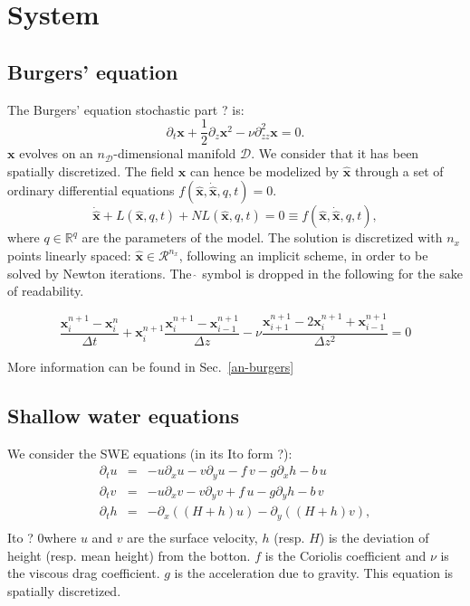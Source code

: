 \documentclass[aip,pof,nofootinbib,reprint,onecolumn]{revtex4-1}
\newcommand{\todo}[1]{{\color{red} #1 }}
\newcommand{\gras}[1]{\boldsymbol{#1}}
\newcommand{\mypar}[1]{\left(#1\right)}
\newcommand{\Ephaz}{\mathcal{D}}%
\newcommand{\Nphaz}{n_{\mathcal{D}}} %
\newcommand{\fdyn}{f} %
\newcommand{\point}{\gras{x}} %
\begin{document}
\section{System}
\label{sec-sys}

\subsection{Burgers' equation}
\label{ssec-burgers}
The Burgers' equation \todo{stochastic part ?}is:
$$ \partial_t \point + \frac{1}{2} \partial_z \point^2 - \nu \partial^2_{zz}\point = 0. $$
$\point$ evolves on an $\Nphaz$-dimensional manifold $\Ephaz$. 
We consider that it has been spatially discretized. The field $\point$ can hence be modelized by $\hat{\point}$ through a set of ordinary differential equations $ \fdyn(\hat{\point},\dot{\hat{\point}},q,t) =0.$
$$ \dot{\hat{\point}} + L(\hat{\point},q,t) + NL(\hat{\point},q,t) = 0 \equiv \fdyn(\hat{\point},\dot{\hat{\point}},q,t), $$
where $q\in \mathbb{R}^{q}$ are the parameters of the model.
The solution is discretized with $n_x$ points linearly spaced: $\hat{\point}\in \mathcal{R}^{n_x}$, following an implicit scheme, in order to be solved by Newton iterations. The $\hat{\,}$ symbol is dropped in the following for the sake of readability.

\begin{equation}
 \frac{\point^{n+1}_i - \point^{n}_i}{\Delta t} + \point^{n+1}_i \frac{\point^{n+1}_i - \point^{n+1}_{i-1}}{\Delta z} - \nu \frac{\point^{n+1}_{i+1} -2 \point^{n+1}_i + \point^{n+1}_{i-1}}{\Delta z ^2} = 0 
\label{eq-fdyn_burgers}
\end{equation}

More information can be found in Sec.~\ref{an-burgers}


\subsection{Shallow water equations}  \label{ssec-swe}
\todo{We consider the \todo{SWE} equations (in its Ito form ?):
\begin{equation}
\begin{array}{lll}
\partial_t u & =& - u \partial_x u - v \partial_y u - f\,v - g \partial_x h -b\,u\\ 
\partial_t v & =& - u \partial_x v - v \partial_y v + f\,u - g \partial_y h -b\,v\\
\partial_t h & =& - \partial_x \mypar{\mypar{H+h}u} - \partial_y \mypar{\mypar{H+h}v}, \\
\end{array}
\label{eq-swe}
\end{equation} 
\todo{Ito ?} 0where $u$ and $v$ are the surface velocity, $h$ (resp. $H$) is the deviation of height (resp. mean height) from the botton. $f$ is the Coriolis coefficient and $\nu$ is the viscous drag coefficient. $g$ is the acceleration due to gravity.
This equation is spatially discretized.}
\end{document}
